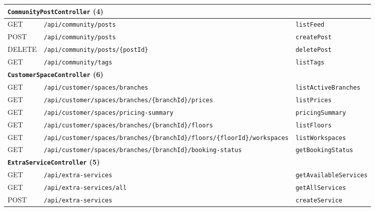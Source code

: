 {\begin{longtable}{|p{1.5cm}|p{7.3cm}|p{5.0cm}|}
\hline
\multicolumn{3}{|l|}{\textbf{\texttt{CommunityPostController} (4)}} \\
\hline
GET & \texttt{/\allowbreak api/\allowbreak community/\allowbreak posts} & \texttt{listFeed} \\
\hline
POST & \texttt{/\allowbreak api/\allowbreak community/\allowbreak posts} & \texttt{createPost} \\
\hline
DELETE & \texttt{/\allowbreak api/\allowbreak community/\allowbreak posts/\allowbreak \{postId\}} & \texttt{deletePost} \\
\hline
GET & \texttt{/\allowbreak api/\allowbreak community/\allowbreak tags} & \texttt{listTags} \\
\hline
\multicolumn{3}{|l|}{\textbf{\texttt{CustomerSpaceController} (6)}} \\
\hline
GET & \texttt{/\allowbreak api/\allowbreak customer/\allowbreak spaces/\allowbreak branches} & \texttt{listActiveBranches} \\
\hline
GET & \texttt{/\allowbreak api/\allowbreak customer/\allowbreak spaces/\allowbreak branches/\allowbreak \{branchId\}/\allowbreak prices} & \texttt{listPrices} \\
\hline
GET & \texttt{/\allowbreak api/\allowbreak customer/\allowbreak spaces/\allowbreak pricing-summary} & \texttt{pricingSummary} \\
\hline
GET & \texttt{/\allowbreak api/\allowbreak customer/\allowbreak spaces/\allowbreak branches/\allowbreak \{branchId\}/\allowbreak floors} & \texttt{listFloors} \\
\hline
GET & \texttt{/\allowbreak api/\allowbreak customer/\allowbreak spaces/\allowbreak branches/\allowbreak \{branchId\}/\allowbreak floors/\allowbreak \{floorId\}/\allowbreak workspaces} & \texttt{listWorkspaces} \\
\hline
GET & \texttt{/\allowbreak api/\allowbreak customer/\allowbreak spaces/\allowbreak branches/\allowbreak \{branchId\}/\allowbreak booking-status} & \texttt{getBookingStatus} \\
\hline
\multicolumn{3}{|l|}{\textbf{\texttt{ExtraServiceController} (5)}} \\
\hline
GET & \texttt{/\allowbreak api/\allowbreak extra-services} & \texttt{getAvailableServices} \\
\hline
GET & \texttt{/\allowbreak api/\allowbreak extra-services/\allowbreak all} & \texttt{getAllServices} \\
\hline
POST & \texttt{/\allowbreak api/\allowbreak extra-services} & \texttt{createService} \\

\end{longtable}}
